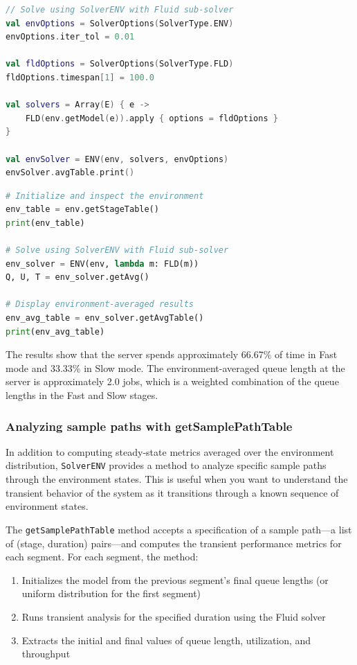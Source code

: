 \begin{KOTLIN}
\begin{lstlisting}[language = kotlin, basicstyle=\ttfamily\scriptsize]
// Solve using SolverENV with Fluid sub-solver
val envOptions = SolverOptions(SolverType.ENV)
envOptions.iter_tol = 0.01

val fldOptions = SolverOptions(SolverType.FLD)
fldOptions.timespan[1] = 100.0

val solvers = Array(E) { e ->
    FLD(env.getModel(e)).apply { options = fldOptions }
}

val envSolver = ENV(env, solvers, envOptions)
envSolver.avgTable.print()
\end{lstlisting}
\end{KOTLIN}
\begin{PYTHON}
\begin{lstlisting}[language = python]
# Initialize and inspect the environment
env_table = env.getStageTable()
print(env_table)

# Solve using SolverENV with Fluid sub-solver
env_solver = ENV(env, lambda m: FLD(m))
Q, U, T = env_solver.getAvg()

# Display environment-averaged results
env_avg_table = env_solver.getAvgTable()
print(env_avg_table)
\end{lstlisting}
\end{PYTHON}

The results show that the server spends approximately 66.67\% of time in Fast mode and 33.33\% in Slow mode. The environment-averaged queue length at the server is approximately 2.0 jobs, which is a weighted combination of the queue lengths in the Fast and Slow stages.

\subsubsection{Analyzing sample paths with getSamplePathTable}
\label{sec:getSamplePathTable}

In addition to computing steady-state metrics averaged over the environment distribution, \texttt{SolverENV} provides a method to analyze specific sample paths through the environment states. This is useful when you want to understand the transient behavior of the system as it transitions through a known sequence of environment states.

The \texttt{getSamplePathTable} method accepts a specification of a sample path---a list of (stage, duration) pairs---and computes the transient performance metrics for each segment. For each segment, the method:
\begin{enumerate}
\item Initializes the model from the previous segment's final queue lengths (or uniform distribution for the first segment)
\item Runs transient analysis for the specified duration using the Fluid solver
\item Extracts the initial and final values of queue length, utilization, and throughput
\end{enumerate}


